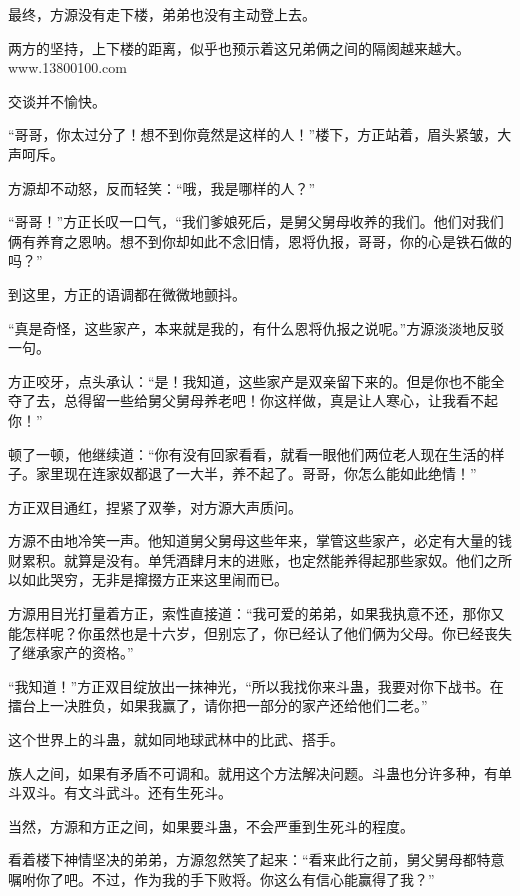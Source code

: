 
\begin{this_body}

最终，方源没有走下楼，弟弟也没有主动登上去。

两方的坚持，上下楼的距离，似乎也预示着这兄弟俩之间的隔阂越来越大。www.13800100.com

交谈并不愉快。

“哥哥，你太过分了！想不到你竟然是这样的人！”楼下，方正站着，眉头紧皱，大声呵斥。

方源却不动怒，反而轻笑：“哦，我是哪样的人？”

“哥哥！”方正长叹一口气，“我们爹娘死后，是舅父舅母收养的我们。他们对我们俩有养育之恩呐。想不到你却如此不念旧情，恩将仇报，哥哥，你的心是铁石做的吗？”

到这里，方正的语调都在微微地颤抖。

“真是奇怪，这些家产，本来就是我的，有什么恩将仇报之说呢。”方源淡淡地反驳一句。

方正咬牙，点头承认：“是！我知道，这些家产是双亲留下来的。但是你也不能全夺了去，总得留一些给舅父舅母养老吧！你这样做，真是让人寒心，让我看不起你！”

顿了一顿，他继续道：“你有没有回家看看，就看一眼他们两位老人现在生活的样子。家里现在连家奴都退了一大半，养不起了。哥哥，你怎么能如此绝情！”

方正双目通红，捏紧了双拳，对方源大声质问。

方源不由地冷笑一声。他知道舅父舅母这些年来，掌管这些家产，必定有大量的钱财累积。就算是没有。单凭酒肆月末的进账，也定然能养得起那些家奴。他们之所以如此哭穷，无非是撺掇方正来这里闹而已。

方源用目光打量着方正，索性直接道：“我可爱的弟弟，如果我执意不还，那你又能怎样呢？你虽然也是十六岁，但别忘了，你已经认了他们俩为父母。你已经丧失了继承家产的资格。”

“我知道！”方正双目绽放出一抹神光，“所以我找你来斗蛊，我要对你下战书。在擂台上一决胜负，如果我赢了，请你把一部分的家产还给他们二老。”

这个世界上的斗蛊，就如同地球武林中的比武、搭手。

族人之间，如果有矛盾不可调和。就用这个方法解决问题。斗蛊也分许多种，有单斗双斗。有文斗武斗。还有生死斗。

当然，方源和方正之间，如果要斗蛊，不会严重到生死斗的程度。

看着楼下神情坚决的弟弟，方源忽然笑了起来：“看来此行之前，舅父舅母都特意嘱咐你了吧。不过，作为我的手下败将。你这么有信心能赢得了我？”


\end{this_body}
